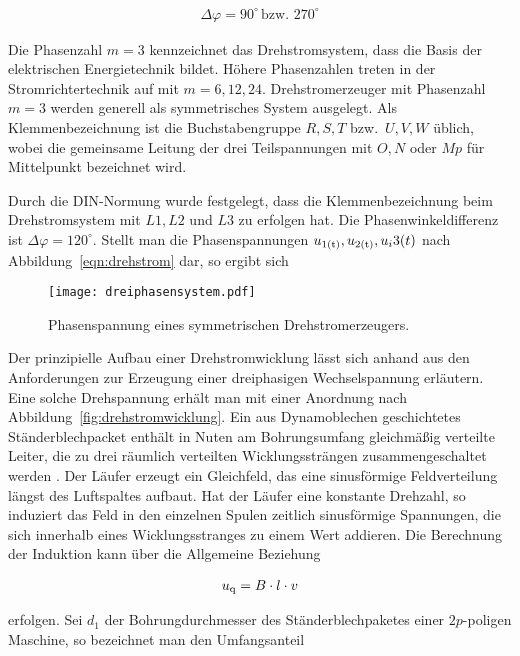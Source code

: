 \begin{align*}
\Delta \varphi = 90^{\circ} \,\text{bzw.\ } 270^{\circ}
\end{align*}

Die Phasenzahl $m=3$ kennzeichnet das Drehstromsystem, dass die Basis der elektrischen Energietechnik bildet.
Höhere Phasenzahlen treten \zB in der Stromrichtertechnik auf mit $m=6, 12, 24$.
Drehstromerzeuger mit Phasenzahl $m=3$ werden generell als symmetrisches System ausgelegt.
Als Klemmenbezeichnung ist die Buchstabengruppe $R, S, T$ bzw.\ $U, V, W$ üblich, wobei die gemeinsame Leitung der drei Teilspannungen mit $O, N$ oder $Mp$ für Mittelpunkt bezeichnet wird.

Durch die DIN-Normung wurde festgelegt, dass die Klemmenbezeichnung beim Drehstromsystem mit $L1, L2$ und $L3$ zu erfolgen hat.
Die Phasenwinkeldifferenz ist $\Delta \varphi = 120^{\circ}$.
Stellt man die Phasenspannungen $u_{\mathrm{1(t)}}, u_{\mathrm{2(t)}}, u_i{3(t)}$ nach Abbildung~\ref{eqn:drehstrom} dar, so ergibt sich 

\begin{figure}[!h]
\centering
\texttt{[image: dreiphasensystem.pdf]}
\label{fig:dreiphasen}
\caption{Phasenspannung eines symmetrischen Drehstromerzeugers.}
\end{figure}

Der prinzipielle Aufbau einer Drehstromwicklung lässt sich anhand aus den Anforderungen zur Erzeugung einer dreiphasigen Wechselspannung erläutern.
Eine solche Drehspannung erhält man mit einer Anordnung nach Abbildung~\ref{fig:drehstromwicklung}.
Ein aus Dynamoblechen geschichtetes Ständerblechpacket enthält in Nuten am Bohrungsumfang gleichmäßig verteilte Leiter, die zu drei räumlich verteilten Wicklungssträngen zusammengeschaltet werden \autocite[S.~141]{fischer2009}.
Der Läufer erzeugt ein Gleichfeld, das eine sinusförmige Feldverteilung längst des Luftspaltes aufbaut.
Hat der Läufer eine konstante Drehzahl, so induziert das Feld in den einzelnen Spulen zeitlich sinusförmige Spannungen, die sich innerhalb eines Wicklungsstranges zu einem Wert addieren.
Die Berechnung der Induktion kann über die Allgemeine Beziehung

\begin{align}
u_{\mathrm{q}} = B\cdot l \cdot v
\end{align}

erfolgen.
Sei $d_1$ der Bohrungdurchmesser des Ständerblechpaketes einer $2p$-poligen Maschine, so bezeichnet man den Umfangsanteil

